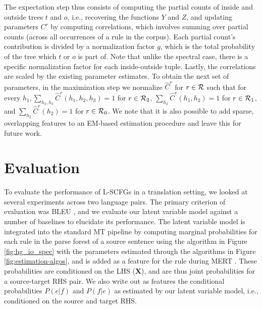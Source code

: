 \documentclass[11pt]{article}
\newcommand{\rules}{{\cal R}}
\newcommand{\e}[1]{\hat{#1}}
\newcommand{\bX}{{\bf X}}
\begin{document}
The expectation step thus consists of computing the partial counts of inside and outside trees $t$ and $o$, i.e., recovering the functions $Y$ and $Z$, and updating parameters $C^r$ by computing correlations, which involves summing over partial counts (across all occurrences of a rule in the corpus). 
Each partial count's contribution is divided by a normalization factor $g$, which is the total probability of the tree which $t$ or $o$ is part of.  
Note that unlike the spectral case, there is a specific normalization factor for each inside-outside tuple. 
Lastly, the correlations are scaled by the existing parameter estimates.
To obtain the next set of parameters, in the maximization step we normalize $\e{C}^r$ for $r \in \rules$ such that for every $h_1, \sum_{h_2,h_3} \e{C}^r(h_1, h_2, h_3) = 1$ for $r \in \rules_2$, $\sum_{h_2} \e{C}^r(h_1, h_2) = 1$ for $r \in \rules_1$, and $\sum_{h_2} \e{C}^r(h_2) = 1$ for $r \in \rules_0$.  
We note that it is also possible to add sparse, overlapping features to an EM-based estimation procedure \cite{Berg-Kirkpatrick2010} and leave this for future work.  

\section{Evaluation}
To evaluate the performance of L-SCFGs in a translation setting, we looked at several experiments across two language pairs.  
The primary criterion of evaluation was BLEU \cite{Papineni2002}, and we evaluate our latent variable model against a number of baselines to elucidate its performance.  
The latent variable model is integrated into the standard MT pipeline by computing marginal probabilities for each rule in the parse forest of a source sentence using the algorithm in Figure \ref{fig:hg_io_spec} with the parameters estimated through the algorithms in Figure \ref{fig:estimation-algos}, and is added as a feature for the rule during MERT \cite{Och2003}.  
These probabilities are conditioned on the LHS (\bX), and are thus joint probabilities for a source-target RHS pair.  
We also write out as features the conditional probabilities $P(e|f)$ and $P(f|e)$ as estimated by our latent variable model, i.e., conditioned on the source and target RHS.  
\end{document}
